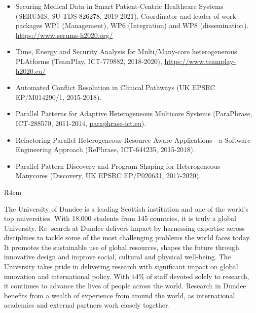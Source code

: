\documentclass[a4paper,11pt]{article}
\begin{document}
\begin{itemize}
\item Securing Medical Data in Smart Patient-Centric Healthcare Systems (SERUMS, SU-TDS 826278, 2019-2021), Coordinator and leader of work packages WP1 (Management), WP6 (Integration) and WP8 (dissemination). \url{https://www.serums-h2020.org/}
\item Time, Energy and Security Analysis for Multi/Many-core heterogenerous PLAtforms (TeamPlay, ICT-779882, 2018-2020), \url{https://www.teamplay-h2020.eu/}
\item Automated Conflict Resolution in Clinical Pathways
(UK EPSRC EP/M014290/1, 2015-2018).
\item Parallel Patterns for Adaptive Heterogeneous Multicore Systems (ParaPhrase, ICT-288570, 2011-2014, \url{paraphrase-ict.eu}).
\item Refactoring Parallel Heterogeneous Resource-Aware Applications - a Software Engineering Approach (RePhrase, ICT-644235, 2015-2018).
\item Parallel Pattern Discovery and Program Shaping for Heterogeneous Manycores (Discovery, UK EPSRC EP/P020631, 2017-2020).

\end{itemize}

\begin{wrapfigure}{R}{4cm}
\vspace{-2cm}
\hfill {}
\vspace{-1cm}
\end{wrapfigure}

The University of Dundee is a leading Scottish institution and one of the world’s top universities. With 18,000 students from 145 countries, it is truly a global University. Re-
search at Dundee delivers impact by harnessing expertise across disciplines to tackle some of the most challenging problems the world faces today. It promotes the sustainable use of global resources, shapes the future through innovative design and improve social, cultural and physical well-being. The University takes pride in delivering research with significant impact on global innovation and international policy. With 44\% of staff devoted solely to research, it continues to advance the lives of people across the world. Research in Dundee benefits from a wealth of experience from around the world, as international academics and external partners work closely together.
\end{document}
